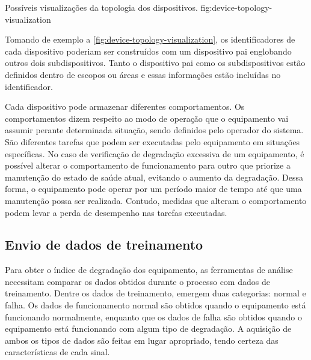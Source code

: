   {Possíveis visualizações da topologia dos dispositivos.}
  {fig:device-topology-visualization}

Tomando de exemplo a \cref{fig:device-topology-visualization}, os identificadores de cada
dispositivo poderiam ser construídos com um dispositivo pai englobando outros dois subdispositivos.
Tanto o dispositivo pai como os subdispositivos estão definidos dentro de escopos ou áreas e essas
informações estão incluídas no identificador.


Cada dispositivo pode armazenar diferentes comportamentos. Os comportamentos dizem respeito ao modo
de operação que o equipamento vai assumir perante determinada situação, sendo definidos pelo
operador do sistema. São diferentes tarefas que podem ser executadas pelo equipamento em situações
específicas. No caso de verificação de degradação excessiva de um equipamento, é possível alterar o
comportamento de funcionamento para outro que priorize a manutenção do estado de saúde atual,
evitando o aumento da degradação. Dessa forma, o equipamento pode operar por um período maior de
tempo até que uma manutenção possa ser realizada. Contudo, medidas que alteram o comportamento podem
levar a perda de desempenho nas tarefas executadas.

\iffalse
A \cref{fig:device-send-behavior} ilustra o envio de novos comportamentos pelo operador do sistema
para um dispositivo. O dispositivo mantém uma lista de comportamentos e seleciona qual o mais
adequado para a situação corrente. A situação é definida pelo nível de saúde obtido através das
análises de dados e representa a degradação de todo ou parte do equipamento.

\includefiguretmp
  {Envio de comportamentos para o dispositivo.}
  {fig:device-send-behavior}
\fi

\subsection{Envio de dados de treinamento}

Para obter o índice de degradação dos equipamento, as ferramentas de análise necessitam comparar os
dados obtidos durante o processo com dados de treinamento. Dentre os dados de treinamento, emergem
duas categorias: normal e falha. Os dados de funcionamento normal são obtidos quando o equipamento
está funcionando normalmente, enquanto que os dados de falha são obtidos quando o equipamento está
funcionando com algum tipo de degradação. A aquisição de ambos os tipos de dados são feitas em lugar
apropriado, tendo certeza das características de cada sinal.

